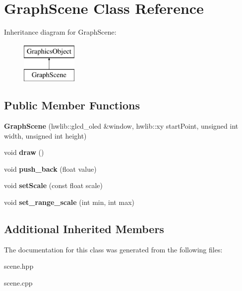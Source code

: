 \hypertarget{class_graph_scene}{}\section{Graph\+Scene Class Reference}
\label{class_graph_scene}
Inheritance diagram for Graph\+Scene\+:\begin{figure}[H]
\begin{center}
\leavevmode
\includegraphics[height=2.000000cm]{class_graph_scene}
\end{center}
\end{figure}
\subsection*{Public Member Functions}
\begin{DoxyCompactItemize}
\item 
\mbox{\label{class_graph_scene_a346e3c827c9268f7b3bb29507dc28d6e}} 
{\bfseries Graph\+Scene} (hwlib\+::glcd\+\_\+oled \&window, hwlib\+::xy start\+Point, unsigned int width, unsigned int height)
\item 
\mbox{\label{class_graph_scene_aedb5e4cc32fd4fdef6e0d5504605f4a1}} 
void {\bfseries draw} ()
\item 
\mbox{\label{class_graph_scene_aa814c91b88a151e2137927c11bfc6b32}} 
void {\bfseries push\+\_\+back} (float value)
\item 
\mbox{\label{class_graph_scene_a1b84f3b649cd82142519771ceb94b04a}} 
void {\bfseries set\+Scale} (const float scale)
\item 
\mbox{\label{class_graph_scene_a2d123bfb5cc206a179c04a70841e6a8f}} 
void {\bfseries set\+\_\+range\+\_\+scale} (int min, int max)
\end{DoxyCompactItemize}
\subsection*{Additional Inherited Members}


The documentation for this class was generated from the following files\+:\begin{DoxyCompactItemize}
\item 
scene.\+hpp\item 
scene.\+cpp\end{DoxyCompactItemize}
